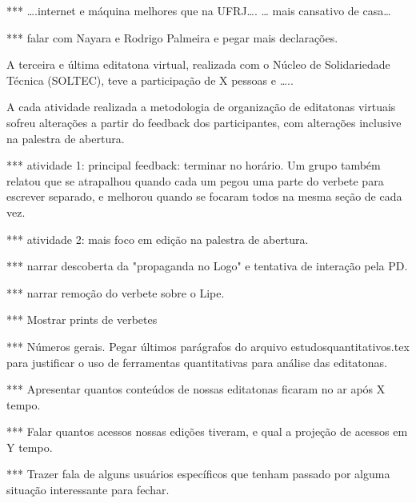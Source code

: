 *** ….internet e máquina melhores que na UFRJ…. … mais cansativo de casa…

*** falar com Nayara e Rodrigo Palmeira e pegar mais declarações.

A terceira e última editatona virtual, realizada com o Núcleo de Solidariedade Técnica (SOLTEC), teve a participação de X pessoas e …..

A cada atividade realizada a metodologia de organização de editatonas virtuais sofreu alterações a partir do feedback dos participantes, com alterações inclusive na palestra de abertura.

*** atividade 1: principal feedback: terminar no horário. Um grupo também relatou que se atrapalhou quando cada um pegou uma parte do verbete para escrever separado, e melhorou quando se focaram todos na mesma seção de cada vez.

*** atividade 2: mais foco em edição na palestra de abertura.

*** narrar descoberta da "propaganda no Logo" e tentativa de interação pela PD.

*** narrar remoção do verbete sobre o Lipe.

*** Mostrar prints de verbetes

*** Números gerais. Pegar últimos parágrafos do arquivo estudosquantitativos.tex para justificar o uso de ferramentas quantitativas para análise das editatonas.

*** Apresentar quantos conteúdos de nossas editatonas ficaram no ar após X tempo.

*** Falar quantos acessos nossas edições tiveram, e qual a projeção de acessos em Y tempo.

*** Trazer fala de alguns usuários específicos que tenham passado por alguma situação interessante para fechar.